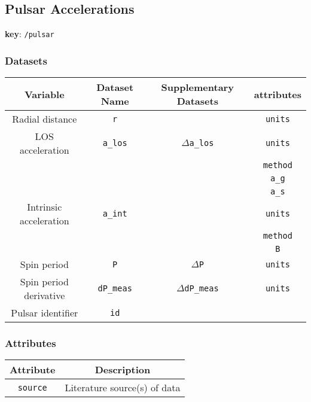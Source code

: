 \subsection{Pulsar Accelerations}

\textbf{key}: \texttt{/pulsar}

\subsubsection{Datasets}

\begin{center}
\begin{tabular}{ | c | c | c | c | }
    \hline
    Variable & Dataset Name & Supplementary Datasets &  attributes \\
    \hline\hline
    Radial distance & \texttt{r} & & \texttt{units} \\
    \hline
    LOS acceleration & \texttt{a\_los} & \texttt{\(\Delta\)a\_los} &
    \texttt{units}\\ &&&\texttt{method}\\ &&&\texttt{a\_g}\\ &&&\texttt{a\_s}\\
    \hline
    Intrinsic acceleration & \texttt{a\_int} & & 
    \texttt{units} \\ & & & \texttt{method} \\ & & & \texttt{B} \\
    \hline
    Spin period & \texttt{P} & \texttt{\(\Delta\)P} & \texttt{units} \\
    \hline
    Spin period derivative & \texttt{dP\_meas} & \texttt{\(\Delta\)dP\_meas} &
    \texttt{units} \\
    \hline
    Pulsar identifier & \texttt{id} & & \\
    \hline
\end{tabular}
\end{center}

\subsubsection{Attributes}


\begin{center}
\begin{tabular}{ | c | c | }
    \hline
    Attribute & Description \\
    \hline\hline
    \texttt{source} & Literature source(s) of data \\
    \hline
\end{tabular}
\end{center}
